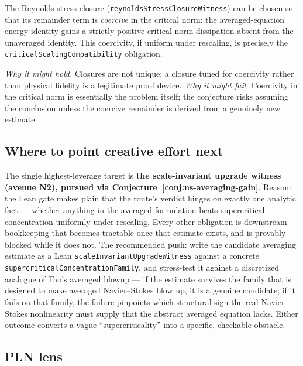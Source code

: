 \begin{conjecture}
\label{conj:ns-reynolds}
The Reynolds-stress closure (\verb|reynoldsStressClosureWitness|) can be chosen
so that its remainder term is \emph{coercive} in the critical norm: the
averaged-equation energy identity gains a strictly positive critical-norm
dissipation absent from the unaveraged identity. This coercivity, if uniform
under rescaling, is precisely the
\verb|criticalScalingCompatibility| obligation.
\end{conjecture}

\noindent\emph{Why it might hold.} Closures are not unique; a closure tuned for
coercivity rather than physical fidelity is a legitimate proof device.
\emph{Why it might fail.} Coercivity in the critical norm is essentially the
problem itself; the conjecture risks assuming the conclusion unless the
coercive remainder is derived from a genuinely new estimate.

\subsection{Where to point creative effort next}

The single highest-leverage target is
\textbf{the scale-invariant upgrade witness (avenue N2), pursued via
Conjecture~\ref{conj:ns-averaging-gain}}. Reason: the Lean gate makes plain that
the route's verdict hinges on exactly one analytic fact --- whether anything in
the averaged formulation beats supercritical concentration uniformly under
rescaling. Every other obligation is downstream bookkeeping that becomes
tractable once that estimate exists, and is provably blocked while it does not.
The recommended push: write the candidate averaging estimate as a Lean
\verb|scaleInvariantUpgradeWitness| against a concrete
\verb|supercriticalConcentrationFamily|, and stress-test it against a discretized
analogue of Tao's averaged blowup --- if the estimate survives the family that is
designed to make averaged Navier--Stokes blow up, it is a genuine candidate; if
it fails on that family, the failure pinpoints which structural sign the real
Navier--Stokes nonlinearity must supply that the abstract averaged equation
lacks. Either outcome converts a vague ``supercriticality'' into a specific,
checkable obstacle.

\subsection*{PLN lens}

